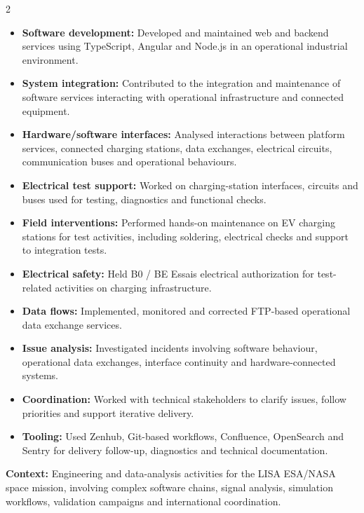 \documentclass[8pt,a4paper,ragged2e,withhyper]{altacv}
\begin{document}
\begin{paracol}{2}
\begin{itemize}
  \item \textbf{Software development:} Developed and maintained web and backend services using TypeScript, Angular and Node.js in an operational industrial environment.
  \item \textbf{System integration:} Contributed to the integration and maintenance of software services interacting with operational infrastructure and connected equipment.
  \item \textbf{Hardware/software interfaces:} Analysed interactions between platform services, connected charging stations, data exchanges, electrical circuits, communication buses and operational behaviours.
  \item \textbf{Electrical test support:} Worked on charging-station interfaces, circuits and buses used for testing, diagnostics and functional checks.
  \item \textbf{Field interventions:} Performed hands-on maintenance on EV charging stations for test activities, including soldering, electrical checks and support to integration tests.
  \item \textbf{Electrical safety:} Held B0 / BE Essais electrical authorization for test-related activities on charging infrastructure.
  \item \textbf{Data flows:} Implemented, monitored and corrected FTP-based operational data exchange services.
  \item \textbf{Issue analysis:} Investigated incidents involving software behaviour, operational data exchanges, interface continuity and hardware-connected systems.
  \item \textbf{Coordination:} Worked with technical stakeholders to clarify issues, follow priorities and support iterative delivery.
  \item \textbf{Tooling:} Used Zenhub, Git-based workflows, Confluence, OpenSearch and Sentry for delivery follow-up, diagnostics and technical documentation.
\end{itemize}

\divider


\textbf{Context:} Engineering and data-analysis activities for the LISA ESA/NASA space mission, involving complex software chains, signal analysis, simulation workflows, validation campaigns and international coordination.


\end{paracol}
\end{document}
